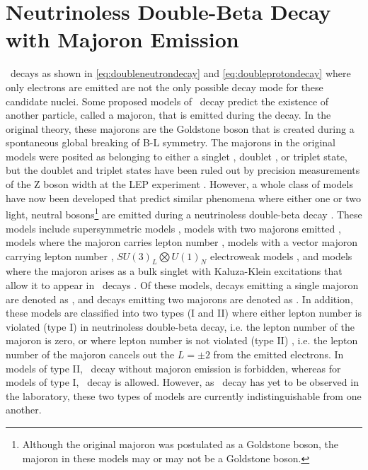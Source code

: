 \section{Neutrinoless Double-Beta Decay with Majoron Emission}
\label{sec:Neutrinoless Double-Beta Decay with Majoron Emisison}
\zeronubb~decays as shown in \autoref{eq:doubleneutrondecay} and \autoref{eq:doubleprotondecay} where only electrons are emitted are not the only possible decay mode for these candidate nuclei.
Some proposed models of \zeronubb~decay predict the existence of another particle, called a majoron, that is emitted during the decay.
In the original theory, these majorons are the Goldstone boson that is created during a spontaneous global breaking of B-L symmetry.
The majorons in the original models were posited as belonging to either a singlet  \cite{CHIKASHIGE1981265}, doublet \cite{AULAKH1982136}, or triplet \cite{GELMINI1981411} state, but the doublet and triplet states have been ruled out by precision measurements of the Z boson width at the LEP experiment \cite{ALEPH:2005ab}.
However, a whole class of models have now been developed that predict similar phenomena where either one or two light, neutral bosons\footnote{Although the original majoron was postulated as a Goldstone boson, the majoron in these models may or may not be a Goldstone boson.}
are emitted during a neutrinoless double-beta decay \cite{HIRSCH19968}.
These models include supersymmetric models \cite{MASIERO1990273}, models with two majorons emitted \cite{MOHAPATRA1988192}, models where the majoron carries lepton number \cite{Burgess:1992dt, PhysRevD.49.5925, BAMERT199525}, models with a vector majoron carrying lepton number \cite{CARONE199385}, $SU(3)_L\bigotimes U(1)_N$ electroweak models \cite{Montero:2000ar}, and models where the majoron arises as a bulk singlet with Kaluza-Klein excitations that allow it to appear in \zeronubb~decays \cite{Mohapatra:2000px}.
Of these models, decays emitting a single majoron are denoted as \zeronubbonechi, and decays emitting two majorons are denoted as \zeronubbtwochi.
In addition, these models are classified into two types (I and II) where either lepton number is  violated (type I) in neutrinoless double-beta decay, i.e. the lepton number of the majoron is zero, or where lepton number is not violated  (type II) , i.e. the lepton number of the majoron cancels out the $L=\pm2$ from the emitted electrons.
In models of type II, \zeronubb~decay without majoron emission is forbidden, whereas for models of type I, \zeronubb~decay is allowed.
However, as \zeronubb~decay has yet to be observed in the laboratory, these two types of models are currently indistinguishable from one another.
